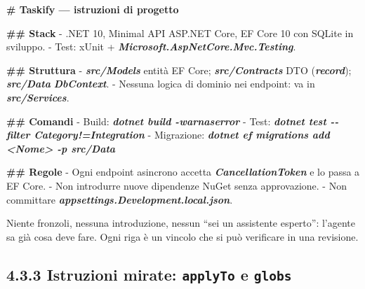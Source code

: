 \documentclass[
  italian,
  10pt,
]{book}
\newenvironment{Shaded}{\begin{snugshade}}{\end{snugshade}}
\newcommand{\FunctionTok}[1]{\textcolor[rgb]{0.13,0.29,0.53}{\textbf{#1}}}
\newcommand{\InformationTok}[1]{\textcolor[rgb]{0.56,0.35,0.01}{\textbf{\textit{#1}}}}
\newcommand{\NormalTok}[1]{#1}
\newcommand{\SpecialStringTok}[1]{\textcolor[rgb]{0.31,0.60,0.02}{#1}}
\begin{document}
\begin{Shaded}
\begin{Highlighting}[]
\FunctionTok{\# Taskify — istruzioni di progetto}

\FunctionTok{\#\# Stack}
\SpecialStringTok{{-} }\NormalTok{.NET 10, Minimal API ASP.NET Core, EF Core 10 con SQLite in sviluppo.}
\SpecialStringTok{{-} }\NormalTok{Test: xUnit + }\InformationTok{\textasciigrave{}Microsoft.AspNetCore.Mvc.Testing\textasciigrave{}}\NormalTok{.}

\FunctionTok{\#\# Struttura}
\SpecialStringTok{{-} }\InformationTok{\textasciigrave{}src/Models\textasciigrave{}}\NormalTok{ entità EF Core; }\InformationTok{\textasciigrave{}src/Contracts\textasciigrave{}}\NormalTok{ DTO (}\InformationTok{\textasciigrave{}record\textasciigrave{}}\NormalTok{); }\InformationTok{\textasciigrave{}src/Data\textasciigrave{}} \InformationTok{\textasciigrave{}DbContext\textasciigrave{}}\NormalTok{.}
\SpecialStringTok{{-} }\NormalTok{Nessuna logica di dominio nei endpoint: va in }\InformationTok{\textasciigrave{}src/Services\textasciigrave{}}\NormalTok{.}

\FunctionTok{\#\# Comandi}
\SpecialStringTok{{-} }\NormalTok{Build: }\InformationTok{\textasciigrave{}dotnet build {-}warnaserror\textasciigrave{}}
\SpecialStringTok{{-} }\NormalTok{Test: }\InformationTok{\textasciigrave{}dotnet test {-}{-}filter Category!=Integration\textasciigrave{}}
\SpecialStringTok{{-} }\NormalTok{Migrazione: }\InformationTok{\textasciigrave{}dotnet ef migrations add \textless{}Nome\textgreater{} {-}p src/Data\textasciigrave{}}

\FunctionTok{\#\# Regole}
\SpecialStringTok{{-} }\NormalTok{Ogni endpoint asincrono accetta }\InformationTok{\textasciigrave{}CancellationToken\textasciigrave{}}\NormalTok{ e lo passa a EF Core.}
\SpecialStringTok{{-} }\NormalTok{Non introdurre nuove dipendenze NuGet senza approvazione.}
\SpecialStringTok{{-} }\NormalTok{Non committare }\InformationTok{\textasciigrave{}appsettings.Development.local.json\textasciigrave{}}\NormalTok{.}
\end{Highlighting}
\end{Shaded}

Niente fronzoli, nessuna introduzione, nessun ``sei un assistente
esperto'': l'agente sa già cosa deve fare. Ogni riga è un vincolo che si
può verificare in una revisione.

\subsection{\texorpdfstring{4.3.3 Istruzioni mirate: \texttt{applyTo} e
\texttt{globs}}{4.3.3 Istruzioni mirate: applyTo e globs}}\label{istruzioni-mirate-applyto-e-globs}
\end{document}
